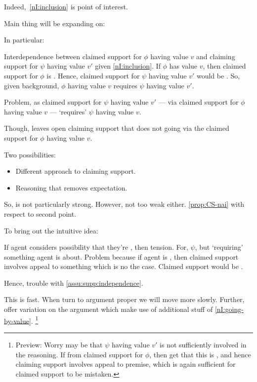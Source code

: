 \begin{note}
  Indeed,~\ref{nI:inclusion} is point of interest.

  Main thing will be expanding on:

  \begin{quote}
    \vspace{-\baselineskip}
    \ideaEIS*
  \end{quote}

  In particular:

  \begin{quote}
    \vspace{-\baselineskip}
    \assuEIS*
  \end{quote}

  Interdependence between claimed support for \(\phi\) having value \(v\) and claiming support for \(\psi\) having value \(v'\) given \ref{nI:inclusion}.
  If \(\phi\) has value \(v\), then claimed support for \(\phi\) is \nmom{}.
  Hence, claimed support for \(\psi\) having value \(v'\) would be \nmom{}.
  So, given background, \(\phi\) having value \(v\) requires \(\psi\) having value \(v'\).

  Problem, as claimed support for \(\psi\) having value \(v'\) --- via claimed support for \(\phi\) having value \(v\) --- `requires' \(\psi\) having value \(v\).

  Though, leaves open claiming support that does not going via the claimed support for \(\phi\) having value \(v\).

  Two possibilities:
  \begin{itemize}
  \item Different approach to claiming support.
  \item Reasoning that removes expectation.
  \end{itemize}

  So, \nI{} is not particularly strong.
  However, not too weak either.
  \autoref{prop:CS-nai} with respect to second point.
\end{note}

\begin{note}
  To bring out the intuitive idea:

  If agent considers possibility that they're \mom{}, then tension.
  For, \(\psi\), but `requiring' something agent is \mom{} about.
  Problem because if agent is \mom{}, then claimed support involves appeal to something which is no the case.
  Claimed support would be \mom{}.

  Hence, trouble with \autoref{assu:supp:independence}.

  This is fast.
  When turn to argument proper we will move more slowly.
  Further, offer variation on the argument which make use of additional stuff of \ref{nI:going-by-value}.\nolinebreak
  \footnote{
    Preview:
    Worry may be that \(\psi\) having value \(v'\) is not sufficiently involved in the reasoning.
    If from claimed support for \(\phi\), then get that this is \mom{}, and hence claiming support involves appeal to \mom{} premise, which is again sufficient for claimed support to be mistaken.
  }
\end{note}

